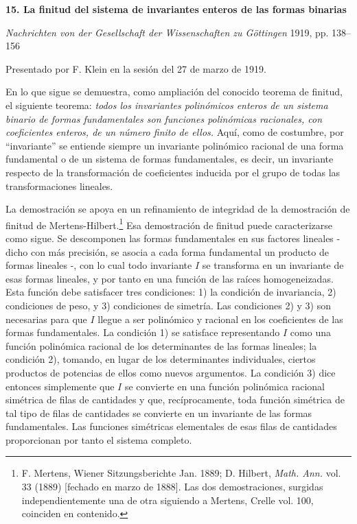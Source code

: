 \documentclass[11pt]{article}
\begin{document}
\providecommand{\frH}{\mathfrak H}
\providecommand{\frK}{\mathfrak K}
\providecommand{\frM}{\mathfrak M}
\providecommand{\frN}{\mathfrak N}
\providecommand{\frG}{\mathfrak G}
\providecommand{\frS}{\mathfrak S}
\providecommand{\tmod}[1]{\;(\operatorname{mod} #1)}

\clearpage
\begin{center}
{\Large\bfseries 15. La finitud del sistema de invariantes enteros de las formas binarias}\par
\vspace{1em}
\emph{Nachrichten von der Gesellschaft der Wissenschaften zu Göttingen} 1919, pp. 138--156
\end{center}

\vspace{2em}
\begin{center}
Presentado por F. Klein en la sesión del 27 de marzo de 1919.
\end{center}

En lo que sigue se demuestra, como ampliación del conocido teorema de finitud, el siguiente teorema:
\emph{todos los invariantes polinómicos enteros de un sistema binario de formas fundamentales son funciones polinómicas racionales, con coeficientes enteros, de un número finito de ellos.}
Aquí, como de costumbre, por ``invariante'' se entiende siempre un invariante polinómico racional de una forma fundamental o de un sistema de formas fundamentales, es decir, un invariante respecto de la transformación de coeficientes inducida por el grupo de todas las transformaciones lineales.

La demostración se apoya en un refinamiento de integridad de la demostración de finitud de Mertens-Hilbert.\footnote{F. Mertens, Wiener Sitzungsberichte Jan. 1889; D. Hilbert, \emph{Math. Ann.} vol. 33 (1889) [fechado en marzo de 1888]. Las dos demostraciones, surgidas independientemente una de otra siguiendo a Mertens, Crelle vol. 100, coinciden en contenido.}
Esa demostración de finitud puede caracterizarse como sigue. Se descomponen las formas fundamentales en sus factores lineales - dicho con más precisión, se asocia a cada forma fundamental un producto de formas lineales -, con lo cual todo invariante \(I\) se transforma en un invariante de esas formas lineales, y por tanto en una función de las raíces homogeneizadas. Esta función debe satisfacer tres condiciones: 1) la condición de invariancia, 2) condiciones de peso, y 3) condiciones de simetría. Las condiciones 2) y 3) son necesarias para que \(I\) llegue a ser polinómico y racional en los coeficientes de las formas fundamentales. La condición 1) se satisface representando \(I\) como una función polinómica racional de los determinantes de las formas lineales; la condición 2), tomando, en lugar de los determinantes individuales, ciertos productos de potencias de ellos como nuevos argumentos. La condición 3) dice entonces simplemente que \(I\) se convierte en una función polinómica racional simétrica de filas de cantidades y que, recíprocamente, toda función simétrica de tal tipo de filas de cantidades se convierte en un invariante de las formas fundamentales. Las funciones simétricas elementales de esas filas de cantidades proporcionan por tanto el sistema completo.
\end{document}
